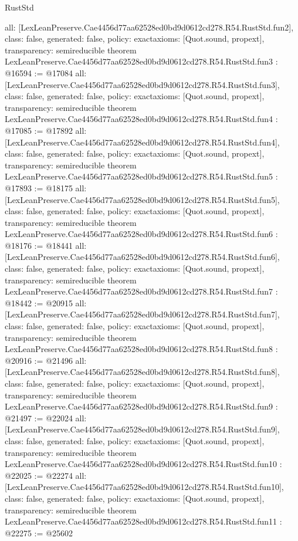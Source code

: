 \begin{lexlean}{RustStd}
\begin{coremodule}
{  all: [LexLeanPreserve.Cae4456d77aa62528ed0bd9d0612cd278.R54.RustStd.fun2],
  class: false,
  generated: false,
  policy: exact{axioms: [Quot.sound, propext]},
  transparency: semireducible
}
theorem LexLeanPreserve.Cae4456d77aa62528ed0bd9d0612cd278.R54.RustStd.fun3 : @16594 := @17084 {
  all: [LexLeanPreserve.Cae4456d77aa62528ed0bd9d0612cd278.R54.RustStd.fun3],
  class: false,
  generated: false,
  policy: exact{axioms: [Quot.sound, propext]},
  transparency: semireducible
}
theorem LexLeanPreserve.Cae4456d77aa62528ed0bd9d0612cd278.R54.RustStd.fun4 : @17085 := @17892 {
  all: [LexLeanPreserve.Cae4456d77aa62528ed0bd9d0612cd278.R54.RustStd.fun4],
  class: false,
  generated: false,
  policy: exact{axioms: [Quot.sound, propext]},
  transparency: semireducible
}
theorem LexLeanPreserve.Cae4456d77aa62528ed0bd9d0612cd278.R54.RustStd.fun5 : @17893 := @18175 {
  all: [LexLeanPreserve.Cae4456d77aa62528ed0bd9d0612cd278.R54.RustStd.fun5],
  class: false,
  generated: false,
  policy: exact{axioms: [Quot.sound, propext]},
  transparency: semireducible
}
theorem LexLeanPreserve.Cae4456d77aa62528ed0bd9d0612cd278.R54.RustStd.fun6 : @18176 := @18441 {
  all: [LexLeanPreserve.Cae4456d77aa62528ed0bd9d0612cd278.R54.RustStd.fun6],
  class: false,
  generated: false,
  policy: exact{axioms: [Quot.sound, propext]},
  transparency: semireducible
}
theorem LexLeanPreserve.Cae4456d77aa62528ed0bd9d0612cd278.R54.RustStd.fun7 : @18442 := @20915 {
  all: [LexLeanPreserve.Cae4456d77aa62528ed0bd9d0612cd278.R54.RustStd.fun7],
  class: false,
  generated: false,
  policy: exact{axioms: [Quot.sound, propext]},
  transparency: semireducible
}
theorem LexLeanPreserve.Cae4456d77aa62528ed0bd9d0612cd278.R54.RustStd.fun8 : @20916 := @21496 {
  all: [LexLeanPreserve.Cae4456d77aa62528ed0bd9d0612cd278.R54.RustStd.fun8],
  class: false,
  generated: false,
  policy: exact{axioms: [Quot.sound, propext]},
  transparency: semireducible
}
theorem LexLeanPreserve.Cae4456d77aa62528ed0bd9d0612cd278.R54.RustStd.fun9 : @21497 := @22024 {
  all: [LexLeanPreserve.Cae4456d77aa62528ed0bd9d0612cd278.R54.RustStd.fun9],
  class: false,
  generated: false,
  policy: exact{axioms: [Quot.sound, propext]},
  transparency: semireducible
}
theorem LexLeanPreserve.Cae4456d77aa62528ed0bd9d0612cd278.R54.RustStd.fun10 : @22025 := @22274 {
  all: [LexLeanPreserve.Cae4456d77aa62528ed0bd9d0612cd278.R54.RustStd.fun10],
  class: false,
  generated: false,
  policy: exact{axioms: [Quot.sound, propext]},
  transparency: semireducible
}
theorem LexLeanPreserve.Cae4456d77aa62528ed0bd9d0612cd278.R54.RustStd.fun11 : @22275 := @25602 {
}
\end{coremodule}
\end{lexlean}
